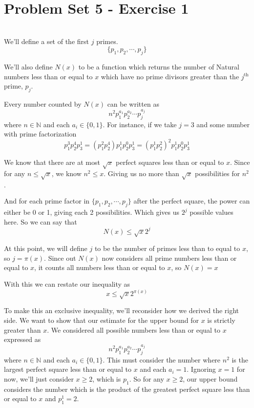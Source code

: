 \documentclass[12pt]{article}
\begin{document}
\section*{Problem Set 5 - Exercise 1}
\\

We'll define a set of the first $j$ primes.
\[\{p_1, p_2, \cdots, p_j\}\]


We'll also define $N(x)$ to be a function which returns the number of Natural numbers less than or equal to $x$ which have no prime divisors greater than the $j^\text{th}$ prime, $p_j$.

Every number counted by $N(x)$ can be written as
\[n^2 p_1^{a_1} p_2^{a_2} \cdots p_j^{a_j}\]
where $n \in \mathbb{N}$ and each $a_i \in \{0,1\}$. For instance, if we take $j=3$ and some number with prime factorization
\[p_1^3 p_2^4 p_3^1 = (p_1^2 p_2^4) p_1^1 p_2^0 p_3^1 = (p_1^1 p_2^2)^2 p_1^1 p_2^0 p_3^1\]

We know that there are at most $\sqrt{x}$ perfect squares less than or equal to $x$. Since for any $n \leq \sqrt{x}$, we know $n^2 \leq x$. Giving us no more than $\sqrt{x}$ possibilities for $n^2$.

And for each prime factor in $\{p_1, p_2, \cdots, p_j\}$ after the perfect square, the power can either be 0 or 1, giving each 2 possibilities. Which gives us $2^j$ possible values here. So we can say that
\[N(x) \leq \sqrt{x}2^j\]

At this point, we will define $j$ to be the number of primes less than to equal to $x$, so $j = \pi(x)$. Since out $N(x)$ now considers all prime numbers less than or equal to $x$, it counts all numbers less than or equal to $x$, so
$N(x) = x$

With this we can restate our inequality as
\[x \leq \sqrt{x}2^{\pi(x)}\]

To make this an exclusive inequality, we'll reconsider how we derived the right side. We want to show that our estimate for the upper bound for $x$ is strictly greater than $x$. We considered all possible numbers less than or equal to $x$ expressed as
\[n^2 p_1^{a_1} p_2^{a_2} \cdots p_j^{a_j}\]
where $n \in \mathbb{N}$ and each $a_i \in \{0,1\}$. This must consider the number where $n^2$ is the largest perfect square less than or equal to $x$ and each $a_i=1$. Ignoring $x=1$ for now, we'll just consider $x \geq 2$, which is $p_1$. So for any $x \geq 2$, our upper bound considers the number which is the product of the greatest perfect square less than or equal to $x$ and $p_1^1 = 2$.
\end{document}
